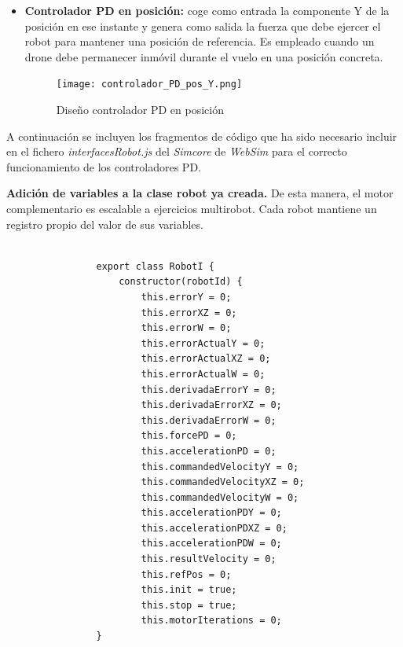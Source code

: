 \begin{itemize}
    \item \textbf{Controlador PD en posición:} coge como entrada la componente Y de la posición en ese instante y genera como salida la fuerza que debe ejercer el robot para mantener una posición de referencia. Es empleado cuando un drone debe permanecer inmóvil durante el vuelo en una posición concreta.
    
    \begin{figure}[h!]
    \centering
    \texttt{[image: controlador\_PD\_pos\_Y.png]}
    \caption{Diseño controlador PD en posición\footnotemark}
    \label{fig:esquema_pd_5}
    \end{figure}
\end{itemize}


A continuación se incluyen los fragmentos de código que ha sido necesario incluir en el fichero \textit{interfacesRobot.js} del \textit{Simcore} de \textit{WebSim} para el correcto funcionamiento de los controladores PD. \newline

\textbf{Adición de variables a la clase robot ya creada.} De esta manera, el motor complementario es escalable a ejercicios multirobot. Cada robot mantiene un registro propio del valor de sus variables.
\small {
\begin{verbatim}

                export class RobotI {
                    constructor(robotId) {
                        this.errorY = 0;
                        this.errorXZ = 0;
                        this.errorW = 0;
                        this.errorActualY = 0;
                        this.errorActualXZ = 0;
                        this.errorActualW = 0;
                        this.derivadaErrorY = 0;
                        this.derivadaErrorXZ = 0;
                        this.derivadaErrorW = 0;
                        this.forcePD = 0;
                        this.accelerationPD = 0;
                        this.commandedVelocityY = 0;
                        this.commandedVelocityXZ = 0;
                        this.commandedVelocityW = 0;
                        this.accelerationPDY = 0;
                        this.accelerationPDXZ = 0;
                        this.accelerationPDW = 0;
                        this.resultVelocity = 0;
                        this.refPos = 0;
                        this.init = true;
                        this.stop = true;
                        this.motorIterations = 0;
                }
                
\end{verbatim}
}

